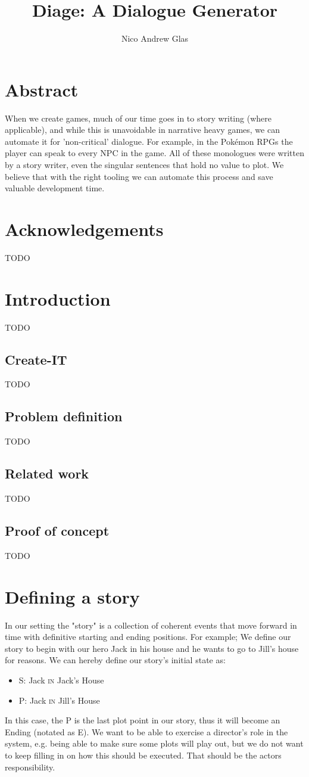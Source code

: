 \documentclass[11pt,a4paper,onecolumn,draft,titlepage]{article}
\author{Nico Andrew Glas}
\title{Diage: A Dialogue Generator}
\begin{document}
\maketitle
\section*{Abstract}
When we create games, much of our time goes in to story writing (where applicable), and while this is unavoidable in narrative heavy games, we can automate it for 'non-critical' dialogue. For example, in the Pokémon RPGs the player can speak to every NPC in the game. All of these monologues were written by a story writer, even the singular sentences that hold no value to plot. We believe that with the right tooling we can automate this process and save valuable development time. \cite{riedl04} \cite{riedl03}
\section*{Acknowledgements}
\Huge TODO
\newpage
\normalsize
\tableofcontents
\newpage
\section{Introduction}
\Huge TODO
\subsection{Create-IT}
\Huge TODO
\subsection{Problem definition}
\Huge TODO
\subsection{Related work}
\Huge TODO
\subsection{Proof of concept}
\Huge TODO
\section{Defining a story}
\normalsize In our setting the "story" is a collection of coherent events that move forward in time with definitive starting and ending positions. For example; We define our story to begin with our hero Jack in his house and he wants to go to Jill's house for reasons. We can hereby define our story's initial state as:
\begin{itemize}
\item[] \textsf{S}: Jack \textsc{in} Jack's House
\item[] \textsf{P}: Jack \textsc{in} Jill's House
\end{itemize}
In this case, the \textsf{P} is the last plot point in our story, thus it will become an Ending (notated as \textsf{E}). We want to be able to exercise a director's role in the system, e.g. being able to make sure some plots will play out, but we do not want to keep filling in on how this should be executed. That should be the actors responsibility. 
\end{document}
